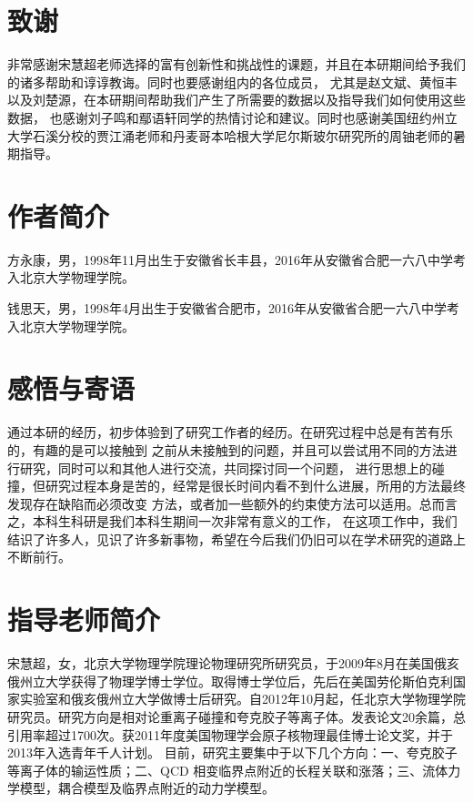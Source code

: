 \documentclass[aps,pre,12pt,preprint,onecolumn,showpacs,showkeys]{revtex4-1}
\begin{document}
\section{致谢}
非常感谢宋慧超老师选择的富有创新性和挑战性的课题，并且在本研期间给予我们的诸多帮助和谆谆教诲。同时也要感谢组内的各位成员，
尤其是赵文斌、黄恒丰以及刘楚源，在本研期间帮助我们产生了所需要的数据以及指导我们如何使用这些数据，
也感谢刘子鸣和鄢语轩同学的热情讨论和建议。同时也感谢美国纽约州立大学石溪分校的贾江涌老师和丹麦哥本哈根大学尼尔斯玻尔研究所的周铀老师的暑期指导。



%
%
%
%
%
%
%
%
%
%
%
%
%
%
%



\section{\heiti{}作者简介}
方永康，男，1998年11月出生于安徽省长丰县，2016年从安徽省合肥一六八中学考入北京大学物理学院。\par
钱思天，男，1998年4月出生于安徽省合肥市，2016年从安徽省合肥一六八中学考入北京大学物理学院。
\section{\heiti{}感悟与寄语}
通过本研的经历，初步体验到了研究工作者的经历。在研究过程中总是有苦有乐的，有趣的是可以接触到
之前从未接触到的问题，并且可以尝试用不同的方法进行研究，同时可以和其他人进行交流，共同探讨同一个问题，
进行思想上的碰撞，但研究过程本身是苦的，经常是很长时间内看不到什么进展，所用的方法最终发现存在缺陷而必须改变
方法，或者加一些额外的约束使方法可以适用。总而言之，本科生科研是我们本科生期间一次非常有意义的工作，
在这项工作中，我们结识了许多人，见识了许多新事物，希望在今后我们仍旧可以在学术研究的道路上不断前行。

\section{\heiti{}指导老师简介}
宋慧超，女，北京大学物理学院理论物理研究所研究员，于2009年8月在美国俄亥俄州立大学获得了物理学博士学位。取得博士学位后，先后在美国劳伦斯伯克利国家实验室和俄亥俄州立大学做博士后研究。自2012年10月起，任北京大学物理学院研究员。研究方向是相对论重离子碰撞和夸克胶子等离子体。发表论文20余篇，总引用率超过1700次。获2011年度美国物理学会原子核物理最佳博士论文奖，并于2013年入选青年千人计划。
目前，研究主要集中于以下几个方向：一、夸克胶子等离子体的输运性质；二、QCD 相变临界点附近的长程关联和涨落；三、流体力学模型，耦合模型及临界点附近的动力学模型。
\end{document}
